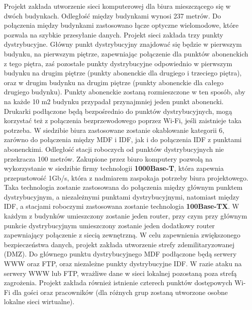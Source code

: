 \documentclass[a4paper, 12pt]{article}
\begin{document}
Projekt zakłada utworzenie sieci komputerowej dla biura mieszczącego się w dwóch budynkach. Odległość między budynkami wynosi 237 metrów. Do połączenia między budynkami zastosowano łącze optyczne wielomodowe, które pozwala na szybkie przesyłanie danych. Projekt sieci zakłada trzy punkty dystrybucyjne. Główny punkt dystrybucyjny znajdować się będzie w pierwszym budynku, na pierwszym piętrze, zapewniając połączenie dla punktów abonenckich z tego piętra, zaś pozostałe punkty dystrybucyjne odpowiednio w pierwszym budynku na drugim piętrze (punkty abonenckie dla drugiego i trzeciego piętra), oraz w drugim budynku na drugim piętrze (punkty abonenckie dla całego drugiego budynku). Punkty abonenckie zostaną rozmieszczone w ten sposób, aby na każde 10 m2 budynku przypadał przynajmniej jeden punkt abonencki. Drukarki podłączone będą bezpośrednio do punktów dystrybucyjnych, mogą korzystać też z połączenia bezprzewodowego poprzez Wi-Fi, jeśli zaistnieje taka potrzeba. 
\newline \indent W siedzibie biura zastosowane zostanie okablowanie kategorii 6, zarówno do połączenia między MDF i IDF, jak i do połączenia IDF z punktami abonenckimi. Odległość stacji roboczych od punktów dystrybucyjnych nie przekracza 100 metrów. Zakupione przez biuro komputery pozwolą na wykorzystanie w siedzibie firmy technologii \textbf{1000Base-T}, która zapewnia przepustowość 1Gb/s, która z nadmiarem zaspokaja potrzeby biura projektowego. Taka technologia zostanie zastosowana do połączenia między głównym punktem dystrybucyjnym, a niezależnymi punktami dystrybucyjnymi, natomiast między IDF, a stacjami roboczymi zastosowana zostanie technologia \textbf{100Base-TX}.
\newline \indent W każdym z budynków umieszczony zostanie jeden router, przy czym przy głównym punkcie dystrybucyjnym umieszczony zostanie jeden dodatkowy router zapewniający połączenie z siecią zewnętrzną.
W celu zapewnienia zwiększonego bezpieczeństwa danych, projekt zakłada utworzenie strefy zdemilitaryzowanej (DMZ). Do głównego punktu dystrybucyjnego MDF podłączone będą serwery WWW oraz FTP, oraz niezależne punkty dystrybucyjne IDF. W razie ataku na serwery WWW lub FTP, wrażliwe dane w sieci lokalnej pozostaną poza strefą zagrożenia. Projekt zakłada również istnienie czterech punktów dostępowych Wi-Fi dla gości oraz pracowników (dla różnych grup zostaną utworzone osobne lokalne sieci wirtualne).
\end{document}
